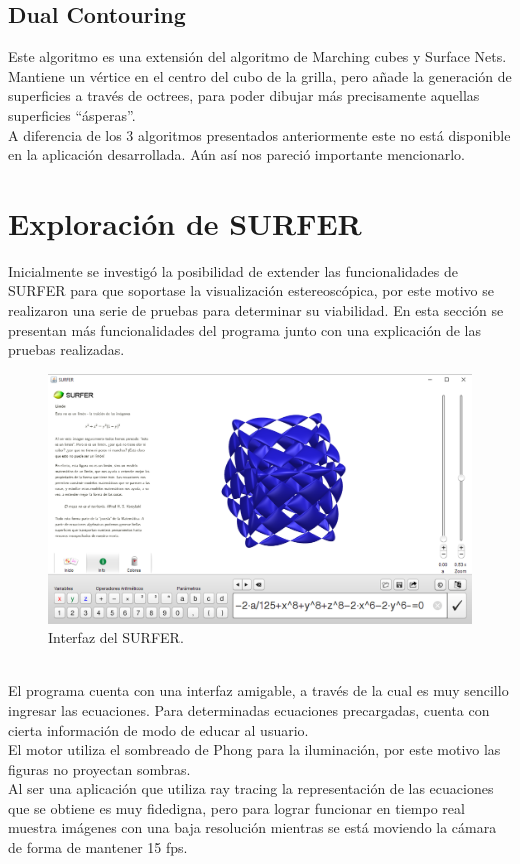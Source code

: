 \documentclass[12pt]{article}
\begin{document}
\subsection{Dual Contouring}
Este algoritmo es una extensión del algoritmo de Marching cubes y Surface Nets. Mantiene un vértice en el centro del cubo de la grilla, pero añade la generación de superficies a través de octrees, para poder dibujar más precisamente aquellas superficies “ásperas”. \\A diferencia de los 3 algoritmos presentados anteriormente este no está disponible en la aplicación desarrollada. Aún así nos pareció importante mencionarlo\cite{dualcontour}.
\clearpage
\section{Exploración de SURFER}
Inicialmente se investigó la posibilidad de extender las funcionalidades de SURFER para que soportase la visualización estereoscópica, por este motivo se realizaron una serie de pruebas para determinar su viabilidad. En esta sección se presentan más funcionalidades del programa junto con una explicación de las pruebas realizadas.
\begin{figure}[h]
\includegraphics[width=\textwidth]{surfer_interfaz.png}
\caption{Interfaz del SURFER.}
\end{figure}
\\El programa cuenta con una interfaz amigable, a través de la cual es muy sencillo ingresar las ecuaciones. Para determinadas ecuaciones precargadas, cuenta con cierta información de modo de educar al usuario.
\\El motor utiliza el sombreado de Phong\cite{Phong} para la iluminación, por este motivo las figuras no proyectan sombras.
\\Al ser una aplicación que utiliza ray tracing la representación de las ecuaciones que se obtiene es muy fidedigna, pero para lograr funcionar en tiempo real muestra imágenes con una baja resolución mientras se está moviendo la cámara de forma de mantener 15 fps.
\end{document}
